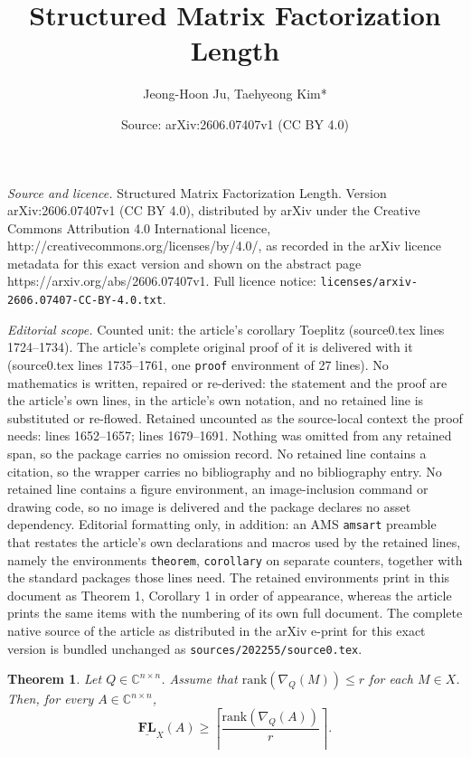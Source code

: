 \documentclass[10pt,a4paper]{amsart}
\title{Structured Matrix Factorization Length}
\author{Jeong-Hoon Ju, Taehyeong Kim*}
\date{Source: arXiv:2606.07407v1 (CC BY 4.0)}
\newtheorem{theorem}{Theorem}
\newcommand{\rank}{\mathrm{rank}}
\begin{document}
\maketitle

\noindent\emph{Source and licence.} Structured Matrix Factorization Length. Version arXiv:2606.07407v1 (CC BY 4.0), distributed by arXiv under the Creative Commons Attribution 4.0 International licence, http://creativecommons.org/licenses/by/4.0/, as recorded in the arXiv licence metadata for this exact version and shown on the abstract page https://arxiv.org/abs/2606.07407v1. Full licence notice: \texttt{licenses/arxiv-2606.07407-CC-BY-4.0.txt}.\par\smallskip

\noindent\textit{Editorial scope.} Counted unit: the article's corollary Toeplitz (source0.tex lines 1724--1734). The article's complete original proof of it is delivered with it (source0.tex lines 1735--1761, one \texttt{proof} environment of 27 lines). No mathematics is written, repaired or re-derived: the statement and the proof are the article's own lines, in the article's own notation, and no retained line is substituted or re-flowed.  Retained uncounted as the source-local context the proof needs: lines 1652--1657; lines 1679--1691.  Nothing was omitted from any retained span, so the package carries no omission record.  No retained line contains a citation, so the wrapper carries no bibliography and no bibliography entry.  No retained line contains a figure environment, an image-inclusion command or drawing code, so no image is delivered and the package declares no asset dependency.  Editorial formatting only, in addition: an AMS \texttt{amsart} preamble that restates the article's own declarations and macros used by the retained lines, namely the environments \texttt{theorem}, \texttt{corollary} on separate counters, together with the standard packages those lines need.  The retained environments print in this document as Theorem 1, Corollary 1 in order of appearance, whereas the article prints the same items with the numbering of its own full document.  The complete native source of the article as distributed in the arXiv e-print for this exact version is bundled unchanged as \texttt{sources/202255/source0.tex}.
\begin{theorem}\label{thm:lower bound from displacement rank, one matrix}
    Let $Q \in \mathbb{C}^{n \times n}$. Assume that $\rank(\nabla_{Q}(M)) \leq r$ for each $M \in X$. Then, for every $A \in \mathbb{C}^{n \times n}$,
    \begin{equation*}
        \underline{\mathbf{FL}}_X(A) \geq \left\lceil \frac{\rank(\nabla_{Q}(A))}{r} \right\rceil.
    \end{equation*}
\end{theorem}
\end{document}
